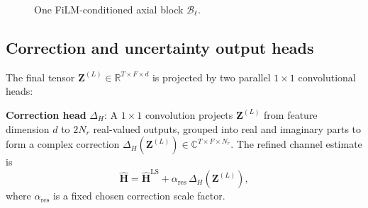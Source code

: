 \documentclass[conference,letterpaper]{IEEEtran}
\begin{document}
\begin{figure}[t]
{%
		}
		\caption{One FiLM-conditioned axial block $\mathcal{B}_\ell$. }
		\label{fig:prompted_block}
	\end{figure}
	\vspace{-.2cm}
	\subsection{Correction and uncertainty output heads}
	\label{subsec:output_heads}
	\label{subsec:training}	
	The final tensor $\mathbf{Z}^{(L)}\in\mathbb{R}^{T\times F\times d}$ is projected by two parallel $1\times1$ convolutional heads:
	
	\textbf{Correction head} $\Delta_H$: A $1\times1$ convolution projects $\mathbf{Z}^{(L)}$ from feature dimension $d$ to $2N_r$ real-valued outputs, grouped into real and imaginary parts to form a complex correction $\Delta_H(\mathbf{Z}^{(L)})\in\mathbb{C}^{T\times F\times N_r}$.
	The refined channel estimate is
	\begin{equation}
		\label{eq:residual_head}
		\widehat{\mathbf{H}}
		=
		\widehat{\mathbf{H}}^{\mathrm{LS}}
		+
		\alpha_{\mathrm{res}}\,\Delta_H\!\left(\mathbf{Z}^{(L)}\right),
	\end{equation}
	where $\alpha_{\mathrm{res}}$ is a fixed chosen correction scale factor.
	
\end{document}
